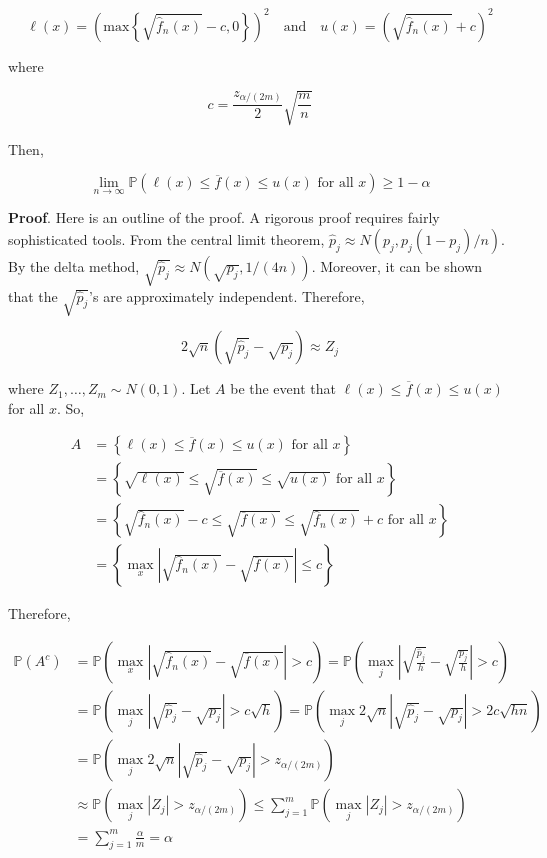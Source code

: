 \[
\ell(x) = \left( \text{max} \left\{\sqrt{\hat{f}_n(x)} - c, 0\right\} \right)^2
\quad \text{and} \quad
u(x) = \left(\sqrt{\hat{f}_n(x)} + c \right)^2
\]

where

\[
c = \frac{z_{\alpha / (2 m)}}{2} \sqrt{\frac{m}{n}}
\]

Then,

\[
\lim_{n \rightarrow \infty} \mathbb{P} \left( \ell(x) \leq \overline{f}(x) \leq u(x) \text{ for all } x \right) \geq 1 - \alpha
\]

\textbf{Proof}. Here is an outline of the proof. A rigorous proof
requires fairly sophisticated tools. From the central limit theorem,
\(\hat{p}_j \approx N\left(p_j, p_j (1 - p_j) / n\right)\). By the delta
method, \(\sqrt{\hat{p}_j} \approx N\left(\sqrt{p_j}, 1 / (4n)\right)\).
Moreover, it can be shown that the \(\sqrt{\hat{p}_j}\)'s are
approximately independent. Therefore,

\[ 2 \sqrt{n} \left( \sqrt{\hat{p}_j} - \sqrt{p_j} \right) \approx Z_j \]

where \(Z_1, \dots, Z_m \sim N(0, 1)\). Let \(A\) be the event that
\(\ell(x) \leq \overline{f}(x) \leq u(x)\) for all \(x\). So,

\[
\begin{align}
A &= \left\{ \ell(x) \leq \overline{f}(x) \leq u(x) \text{ for all } x \right\} \\
&= \left\{ \sqrt{\ell(x)} \leq \sqrt{\overline{f}(x)} \leq \sqrt{u(x)} \text{ for all } x \right\} \\
&= \left\{ \sqrt{\hat{f}_n(x)} - c \leq \sqrt{\overline{f}(x)} \leq \sqrt{\hat{f}_n(x)} + c \text{ for all } x \right\} \\
&= \left\{ \max_x \left| \sqrt{\hat{f}_n(x)} - \sqrt{\overline{f}(x)} \right| \leq c \right\}
\end{align}
\]

Therefore,

\[
\begin{align}
\mathbb{P}(A^c) &= \mathbb{P} \left( \max_x \left| \sqrt{\hat{f}_n(x)} - \sqrt{\overline{f}(x)} \right| > c\right)
= \mathbb{P} \left( \max_j \left| \sqrt{\frac{\hat{p}_j}{h}} - \sqrt{\frac{p_j}{h}} \right| > c\right) \\
&= \mathbb{P} \left( \max_j \left| \sqrt{\hat{p}_j} - \sqrt{p_j} \right| > c \sqrt{h} \right)
= \mathbb{P} \left( \max_j 2 \sqrt{n} \left| \sqrt{\hat{p}_j} - \sqrt{p_j} \right| > 2 c \sqrt{hn} \right) \\
&= \mathbb{P} \left( \max_j 2 \sqrt{n} \left| \sqrt{\hat{p}_j} - \sqrt{p_j} \right| > z_{\alpha / (2m)} \right) \\
&\approx \mathbb{P} \left( \max_j \left| Z_j \right| > z_{\alpha / (2m)} \right)
 \leq \sum_{j=1}^m \mathbb{P} \left( \max_j \left| Z_j \right| > z_{\alpha / (2m)} \right) \\
&= \sum_{j=1}^m \frac{\alpha}{m} = \alpha
\end{align}
\]

